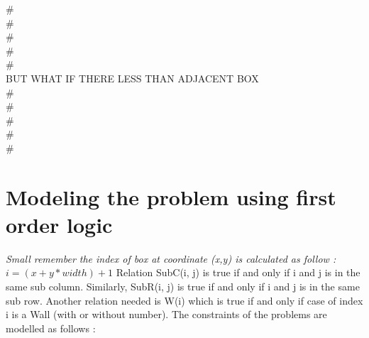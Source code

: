 \documentclass[a4paper]{article}
\begin{document}
\begin{enumerate}
\begin{enumerate}
\end{enumerate}
\# \\
\# \\
\# \\
\# \\
\# \\
BUT WHAT IF THERE LESS THAN ADJACENT BOX \\
\# \\
\# \\
\# \\
\# \\
\# \\
\end{enumerate}

\section{Modeling the problem using first order logic}
\textit{Small remember the index of box at coordinate (x,y) is calculated as follow : $i = (x+y*width)+1$}
Relation SubC(i, j) is true if and only if i and j is in the same sub column. Similarly, SubR(i, j) is true if and only if i and j is in the same sub row. Another relation needed is W(i) which is true if and only if case of index i is a Wall (with or without number).  The constraints of the problems are modelled as follows :
\end{document}
